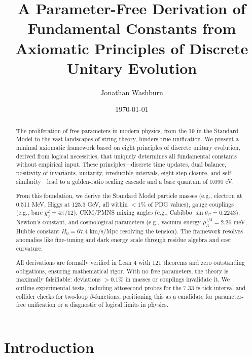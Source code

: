 \documentclass[twocolumn,prd,amsmath,amssymb,aps,superscriptaddress,nofootinbib]{revtex4-2}
\begin{document}
\title{A Parameter-Free Derivation of Fundamental Constants from Axiomatic Principles of Discrete Unitary Evolution}

\author{Jonathan Washburn}

\date{\today}

\begin{abstract}
The proliferation of free parameters in modern physics, from the 19 in the Standard Model to the vast landscapes of string theory, hinders true unification. We present a minimal axiomatic framework based on eight principles of discrete unitary evolution, derived from logical necessities, that uniquely determines all fundamental constants without empirical input. These principles—discrete time updates, dual balance, positivity of invariants, unitarity, irreducible intervals, eight-step closure, and self-similarity—lead to a golden-ratio scaling cascade and a base quantum of 0.090 eV.

From this foundation, we derive the Standard Model particle masses (e.g., electron at 0.511 MeV, Higgs at 125.3 GeV, all within $<1\%$ of PDG values), gauge couplings (e.g., bare $g_3^2 = 4\pi/12$), CKM/PMNS mixing angles (e.g., Cabibbo $\sin\theta_C = 0.2243$), Newton's constant, and cosmological parameters (e.g., vacuum energy $\rho_\Lambda^{1/4} = 2.26$ meV, Hubble constant $H_0 = 67.4$ km/s/Mpc resolving the tension). The framework resolves anomalies like fine-tuning and dark energy scale through residue algebra and cost curvature.

All derivations are formally verified in Lean 4 with 121 theorems and zero outstanding obligations, ensuring mathematical rigor. With no free parameters, the theory is maximally falsifiable: deviations $>0.1\%$ in masses or couplings invalidate it. We outline experimental tests, including attosecond probes for the 7.33 fs tick interval and collider checks for two-loop $\beta$-functions, positioning this as a candidate for parameter-free unification or a diagnostic of logical limits in physics.
\end{abstract}

\maketitle

\tableofcontents

\section{Introduction}
\label{sec:introduction}
\end{document}
